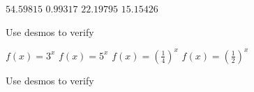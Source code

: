 \begin{Answer}[ref={exExpFunctions}]
\Question %
\begin{tasks}
	\task $54.59815$ 
	\task $0.99317$ 
	\task $22.19795$ 
	\task $15.15426$
\end{tasks}

\Question Use desmos to verify%

\Question %
\begin{tasks}
	\task $f (x) =3^{x}$ 
	\task $f (x) =5^{x}$ 
	\task $f (x) =\genfrac{(}{)}{}{}{1}{4}^{x}$ 
	\task $f (x) =\genfrac{(}{)}{}{}{1}{2}^{x}$ 
\end{tasks}

\Question Use desmos to verify%
\end{Answer}%

